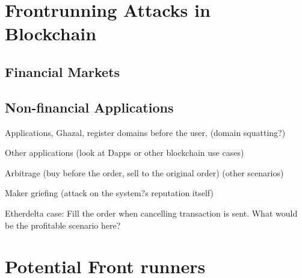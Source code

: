 \section{Frontrunning Attacks in Blockchain}

\subsection{Financial Markets}




\subsection{Non-financial Applications}
Applications, Ghazal, register domains before the user, (domain squatting?) \par\noindent
Other applications (look at Dapps or other blockchain use cases)\par\noindent
Arbitrage (buy before the order, sell to the original order) (other scenarios)\par\noindent
Maker griefing (attack on the system?s reputation itself)\par\noindent
Etherdelta case: Fill the order when cancelling transaction is sent. What would be the profitable scenario here?







\section{Potential Front runners} %





